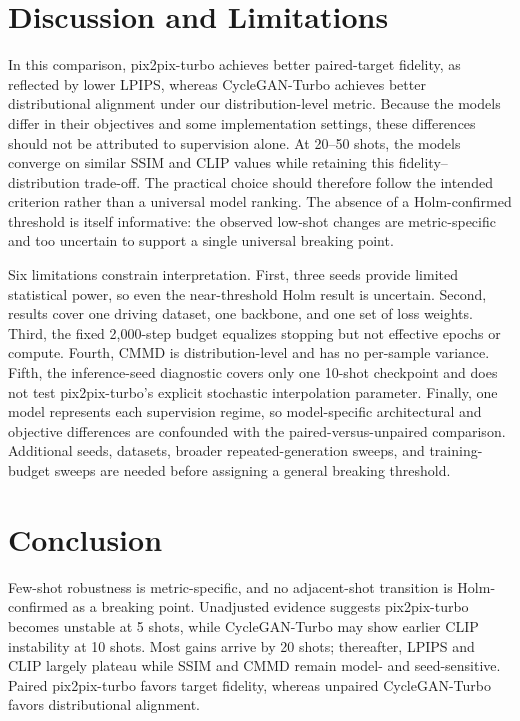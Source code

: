 \documentclass{article}
\begin{document}
\section{Discussion and Limitations}

In this comparison, pix2pix-turbo achieves better paired-target fidelity, as reflected by lower LPIPS, whereas CycleGAN-Turbo achieves better distributional alignment under our distribution-level metric. Because the models differ in their objectives and some implementation settings, these differences should not be attributed to supervision alone. At 20--50 shots, the models converge on similar SSIM and CLIP values while retaining this fidelity--distribution trade-off. The practical choice should therefore follow the intended criterion rather than a universal model ranking. The absence of a Holm-confirmed threshold is itself informative: the observed low-shot changes are metric-specific and too uncertain to support a single universal breaking point.

Six limitations constrain interpretation. First, three seeds provide limited statistical power, so even the near-threshold Holm result is uncertain. Second, results cover one driving dataset, one backbone, and one set of loss weights. Third, the fixed 2,000-step budget equalizes stopping but not effective epochs or compute. Fourth, CMMD is distribution-level and has no per-sample variance. Fifth, the inference-seed diagnostic covers only one 10-shot checkpoint and does not test pix2pix-turbo's explicit stochastic interpolation parameter. Finally, one model represents each supervision regime, so model-specific architectural and objective differences are confounded with the paired-versus-unpaired comparison. Additional seeds, datasets, broader repeated-generation sweeps, and training-budget sweeps are needed before assigning a general breaking threshold. 

\section{Conclusion}

Few-shot robustness is metric-specific, and no adjacent-shot transition is Holm-confirmed as a breaking point. Unadjusted evidence suggests pix2pix-turbo becomes unstable at 5 shots, while CycleGAN-Turbo may show earlier CLIP instability at 10 shots. Most gains arrive by 20 shots; thereafter, LPIPS and CLIP largely plateau while SSIM and CMMD remain model- and seed-sensitive. Paired pix2pix-turbo favors target fidelity, whereas unpaired CycleGAN-Turbo favors distributional alignment.
\end{document}
